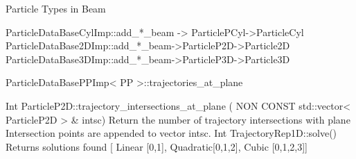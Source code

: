 \documentclass[12pt,a4paper]{article}
\begin{document}
Particle Types in Beam

ParticleDataBaseCylImp::add_*_beam -> ParticlePCyl->ParticleCyl
ParticleDataBase2DImp::add_*_beam->ParticleP2D->Particle2D
ParticleDataBase3DImp::add_*_beam->ParticleP3D->Particle3D



ParticleDataBasePPImp< PP >::trajectories_at_plane 


Int ParticleP2D::trajectory_intersections_at_plane
( NON CONST	std::vector< ParticleP2D > & 	intsc)
Return the number of trajectory intersections with plane
Intersection points are appended to vector intsc.
Int TrajectoryRep1D::solve()
Returns solutions found [ Linear [0,1], Quadratic[0,1,2], Cubic [0,1,2,3]]
\end{document}
